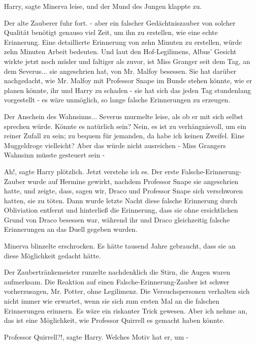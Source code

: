 \glqq Harry\grqq{}, sagte Minerva leise, und der Mund des Jungen klappte zu.

Der alte Zauberer fuhr fort. \glqq - aber ein falscher Gedächtniszauber von
solcher Qualität benötigt genauso viel Zeit, um ihn zu erstellen, wie eine echte
Erinnerung. Eine detaillierte Erinnerung von zehn Minuten zu erstellen, würde
zehn Minuten Arbeit bedeuten. Und laut den Hof-Legilimens\grqq{}, Albus' Gesicht
wirkte jetzt noch müder und faltiger als zuvor, \glqq ist Miss Granger seit dem
Tag, an dem Severus... sie angeschrien hat, von Mr. Malfoy besessen. Sie hat
darüber nachgedacht, wie Mr. Malfoy mit Professor Snape im Bunde stehen könnte,
wie er planen könnte, ihr und Harry zu schaden - sie hat sich das jeden Tag
stundenlang vorgestellt - es wäre unmöglich, so lange falsche Erinnerungen zu
erzeugen.\grqq{}

\glqq Der Anschein des Wahnsinns...\grqq{} Severus murmelte leise, als ob er mit
sich selbst sprechen würde. \glqq Könnte es natürlich sein? Nein, es ist zu
verhängnisvoll, um ein reiner Zufall zu sein; zu bequem für jemanden, da habe
ich keinen Zweifel. Eine Muggeldroge vielleicht? Aber das würde nicht ausreichen
- Miss Grangers Wahnsinn müsste gesteuert sein -\grqq{}

\glqq Ah!\grqq{}, sagte Harry plötzlich. \glqq Jetzt verstehe ich es. Der erste
Falsche-Erinnerung-Zauber wurde auf Hermine gewirkt, nachdem Professor Snape sie
angeschrien hatte, und zeigte, dass, sagen wir, Draco und Professor Snape sich
verschworen hatten, sie zu töten. Dann wurde letzte Nacht diese falsche
Erinnerung durch Obliviation entfernt und hinterließ die Erinnerung, dass sie
ohne ersichtlichen Grund von Draco besessen war, während ihr und Draco
gleichzeitig falsche Erinnerungen an das Duell gegeben wurden.\grqq{}

Minerva blinzelte erschrocken. Es hätte tausend Jahre gebraucht, dass sie an
diese Möglichkeit gedacht hätte.

Der Zaubertränkemeister runzelte nachdenklich die Stirn, die Augen waren
aufmerksam. \glqq Die Reaktion auf einen Falsche-Erinnerung-Zauber ist schwer
vorherzusagen, Mr. Potter, ohne Legilimenz. Die Versuchspersonen verhalten sich
nicht immer wie erwartet, wenn sie sich zum ersten Mal an die falschen
Erinnerungen erinnern. Es wäre ein riskanter Trick gewesen. Aber ich nehme an,
das ist eine Möglichkeit, wie Professor Quirrell es gemacht haben könnte.\grqq{}

\glqq Professor Quirrell?!\grqq{}, sagte Harry. \glqq Welches Motiv hat er, um
-\grqq{}

